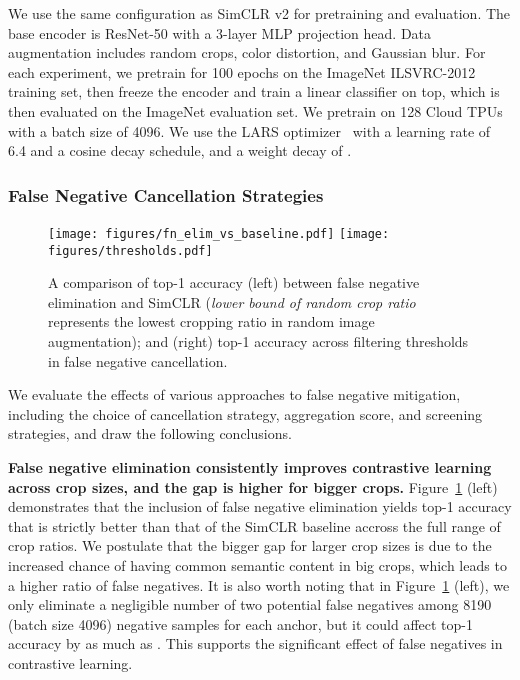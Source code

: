 \documentclass[10pt,twocolumn,letterpaper]{article}
\begin{document}
We use the same configuration as SimCLR v2 for pretraining and evaluation. The base encoder is ResNet-50 with a 3-layer MLP projection head. Data augmentation includes random crops, color distortion, and Gaussian blur. For each experiment, we pretrain for 100 epochs on the ImageNet ILSVRC-2012 training set, then freeze the encoder and train a linear classifier on top, which is then evaluated on the ImageNet evaluation set. We pretrain on 128 Cloud TPUs with a batch size of 4096. We use the LARS optimizer~\cite{ginsburg2018large} with a learning rate of 6.4 and a cosine decay schedule, and a weight decay of .

\subsubsection{False Negative Cancellation Strategies}

\begin{figure}[!t]
    \centering
    \texttt{[image: figures/fn\_elim\_vs\_baseline.pdf]} \hfil
\texttt{[image: figures/thresholds.pdf]}
\caption{A comparison of top-1 accuracy (left) between false negative elimination and SimCLR (\emph{lower bound of random crop ratio} represents the lowest cropping ratio in random image augmentation); and (right) top-1 accuracy across filtering thresholds in false negative cancellation.}\label{fig:top1_accuracy}
    \vspace{-5pt}
\end{figure}
We evaluate the effects of various approaches to false negative mitigation, including the choice of cancellation strategy, aggregation score, and screening strategies, and draw the following conclusions.

\textbf{False negative elimination consistently improves contrastive learning across crop sizes, and the gap is higher for bigger crops.} Figure~\ref{fig:top1_accuracy} (left) demonstrates that the inclusion of false negative elimination yields top-1 accuracy that is strictly better than that of the SimCLR baseline accross the full range of crop ratios. We postulate that the bigger gap for larger crop sizes is due to the increased chance of having common semantic content in big crops, which leads to a higher ratio of false negatives. It is also worth noting that in Figure~\ref{fig:top1_accuracy} (left), we only eliminate a negligible number of two potential false negatives among 8190 (batch size 4096) negative samples for each anchor, but it could affect top-1 accuracy by as much as . This supports the significant effect of false negatives in contrastive learning.
\end{document}
